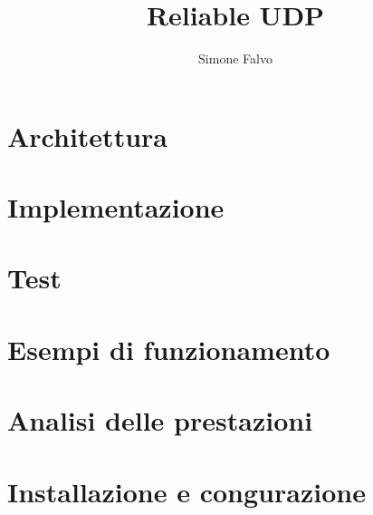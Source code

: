 \documentclass[a4paper,titlepage]{article}
\title{Reliable UDP}
\author{Simone Falvo}
\begin{document}
\maketitle



\tableofcontents
\newpage

\section{Architettura}




\section{Implementazione}







\section{Test}

\section{Esempi di funzionamento}

\section{Analisi delle prestazioni}

\section{Installazione e congurazione}
\end{document}
